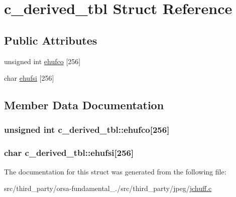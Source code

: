 \hypertarget{structc__derived__tbl}{}\section{c\+\_\+derived\+\_\+tbl Struct Reference}
\label{structc__derived__tbl}
\subsection*{Public Attributes}
\begin{DoxyCompactItemize}
\item 
unsigned int \hyperlink{structc__derived__tbl_acb8d0ecc41a6d9e2d1631122368de665}{ehufco} \mbox{[}256\mbox{]}
\item 
char \hyperlink{structc__derived__tbl_afbf7d9e461bf60c975e26af7404479ee}{ehufsi} \mbox{[}256\mbox{]}
\end{DoxyCompactItemize}


\subsection{Member Data Documentation}
\hypertarget{structc__derived__tbl_acb8d0ecc41a6d9e2d1631122368de665}{}
\subsubsection[{ehufco}]{\setlength{\rightskip}{0pt plus 5cm}unsigned int c\+\_\+derived\+\_\+tbl\+::ehufco\mbox{[}256\mbox{]}}\label{structc__derived__tbl_acb8d0ecc41a6d9e2d1631122368de665}
\hypertarget{structc__derived__tbl_afbf7d9e461bf60c975e26af7404479ee}{}
\subsubsection[{ehufsi}]{\setlength{\rightskip}{0pt plus 5cm}char c\+\_\+derived\+\_\+tbl\+::ehufsi\mbox{[}256\mbox{]}}\label{structc__derived__tbl_afbf7d9e461bf60c975e26af7404479ee}


The documentation for this struct was generated from the following file\+:\begin{DoxyCompactItemize}
\item 
src/third\+\_\+party/orsa-\/fundamental\+\_./src/third\+\_\+party/jpeg/\hyperlink{jchuff_8c}{jchuff.\+c}\end{DoxyCompactItemize}
